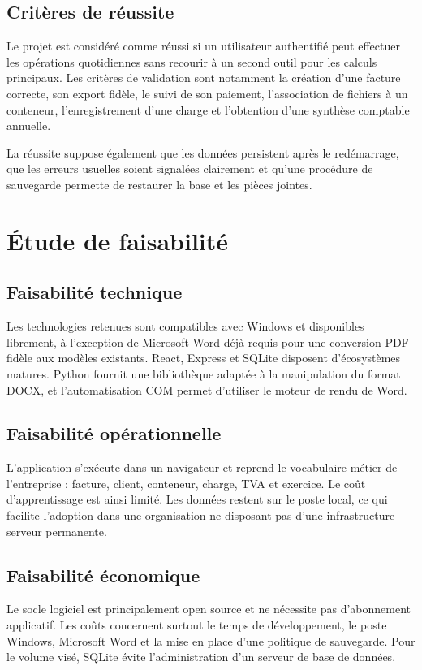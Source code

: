 \documentclass[12pt,a4paper,oneside]{report}
\begin{document}
\subsection{Critères de réussite}
Le projet est considéré comme réussi si un utilisateur authentifié peut effectuer les opérations quotidiennes sans recourir à un second outil pour les calculs principaux. Les critères de validation sont notamment la création d'une facture correcte, son export fidèle, le suivi de son paiement, l'association de fichiers à un conteneur, l'enregistrement d'une charge et l'obtention d'une synthèse comptable annuelle.

La réussite suppose également que les données persistent après le redémarrage, que les erreurs usuelles soient signalées clairement et qu'une procédure de sauvegarde permette de restaurer la base et les pièces jointes.

\section{Étude de faisabilité}
\subsection{Faisabilité technique}
Les technologies retenues sont compatibles avec Windows et disponibles librement, à l'exception de Microsoft Word déjà requis pour une conversion PDF fidèle aux modèles existants. React, Express et SQLite disposent d'écosystèmes matures. Python fournit une bibliothèque adaptée à la manipulation du format DOCX, et l'automatisation COM permet d'utiliser le moteur de rendu de Word.

\subsection{Faisabilité opérationnelle}
L'application s'exécute dans un navigateur et reprend le vocabulaire métier de l'entreprise : facture, client, conteneur, charge, TVA et exercice. Le coût d'apprentissage est ainsi limité. Les données restent sur le poste local, ce qui facilite l'adoption dans une organisation ne disposant pas d'une infrastructure serveur permanente.

\subsection{Faisabilité économique}
Le socle logiciel est principalement open source et ne nécessite pas d'abonnement applicatif. Les coûts concernent surtout le temps de développement, le poste Windows, Microsoft Word et la mise en place d'une politique de sauvegarde. Pour le volume visé, SQLite évite l'administration d'un serveur de base de données.
\end{document}
